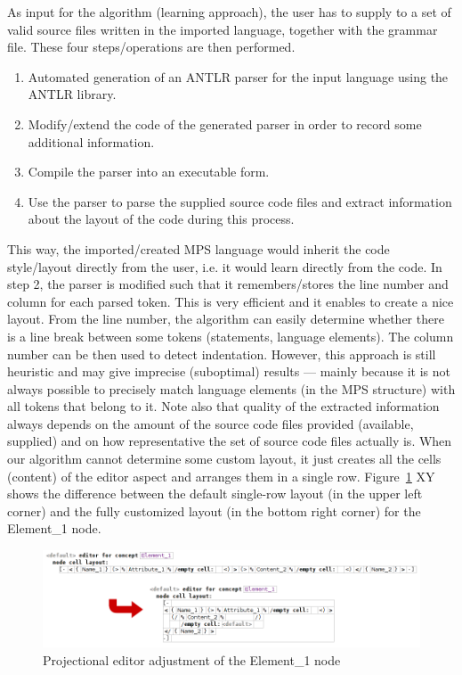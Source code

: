 \documentclass[10pt]{sigplanconf}
\newcommand{\mpsconcept}[1]{\textcolor{mpsconceptcolor}{#1}}
\begin{document}
As input for the algorithm (learning approach), the user has to supply to a set of valid source files written in the imported language, together with the grammar file.
These four steps/operations are then performed.
\begin{enumerate}
	\item Automated generation of an ANTLR parser for the input language using the ANTLR library.
	\item Modify/extend the code of the generated parser in order to record some additional information.
	\item Compile the parser into an executable form.
	\item Use the parser to parse the supplied source code files and extract information about the layout of the code during this process.
\end{enumerate}
This way, the imported/created MPS language would inherit the code style/layout directly from the user, i.e. it would learn directly from the code.
In step 2, the parser is modified such that it remembers/stores the line number and column for each parsed token.
This is very efficient and it enables to create a nice layout.
From the line number, the algorithm can easily determine whether there is a line break between some tokens (statements, language elements).
The column number can be then used to detect indentation.
However, this approach is still heuristic and may give imprecise (suboptimal) results --- mainly because it is not always possible to precisely match language elements (in the MPS structure) with all tokens that belong to it.
Note also that quality of the extracted information always depends on the amount of the source code files provided (available, supplied) and on how representative the set of source code files actually is.
When our algorithm cannot determine some custom layout, it just creates all the cells (content) of the editor aspect and arranges them in a single row.
Figure~\ref{fig:editor_adjustment} XY shows the difference between the default single-row layout (in the upper left corner) and the fully customized layout (in the bottom right corner) for the \mpsconcept{Element{\_}1} node.

\begin{figure}[ht]
	\centering
	\includegraphics[scale=0.5]{./images/editor_adjustment.png}
	\caption{Projectional editor adjustment of the Element{\_}1 node}
	\label{fig:editor_adjustment}
\end{figure}
\end{document}
